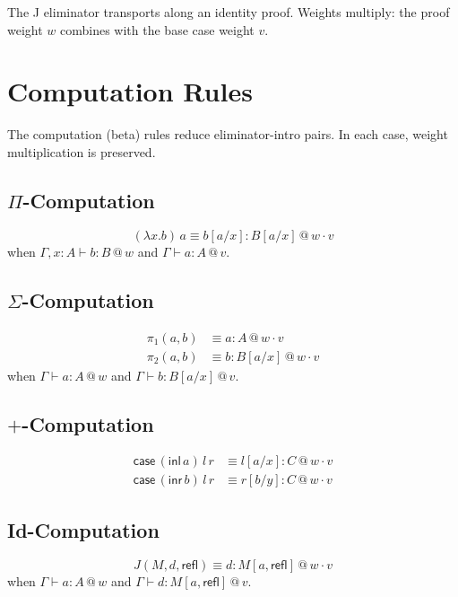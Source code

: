 \documentclass[11pt,a4paper]{article}
\makeatletter
\newcommand{\at}[1]{\,@\,#1}
\makeatother
\begin{document}
The J eliminator transports along an identity proof. Weights multiply: the proof weight $w$ combines with the base case weight $v$.

\section{Computation Rules}

The computation (beta) rules reduce eliminator-intro pairs. In each case, weight multiplication is preserved.

\subsection{$\Pi$-Computation}
\[
(\lambda x. b)\,a \equiv b[a/x] : B[a/x] \at{w \cdot v}
\]
when $\Gamma, x : A \vdash b : B \at{w}$ and $\Gamma \vdash a : A \at{v}$.

\subsection{$\Sigma$-Computation}
\begin{align}
\pi_1(a, b) &\equiv a : A \at{w \cdot v} \\
\pi_2(a, b) &\equiv b : B[a/x] \at{w \cdot v}
\end{align}
when $\Gamma \vdash a : A \at{w}$ and $\Gamma \vdash b : B[a/x] \at{v}$.

\subsection{$+$-Computation}
\begin{align}
\mathsf{case}\,(\mathsf{inl}\,a)\,l\,r &\equiv l[a/x] : C \at{w \cdot v} \\
\mathsf{case}\,(\mathsf{inr}\,b)\,l\,r &\equiv r[b/y] : C \at{w \cdot v}
\end{align}

\subsection{Id-Computation}
\[
J(M, d, \mathsf{refl}) \equiv d : M[a, \mathsf{refl}] \at{w \cdot v}
\]
when $\Gamma \vdash a : A \at{w}$ and $\Gamma \vdash d : M[a, \mathsf{refl}] \at{v}$.

\end{document}
